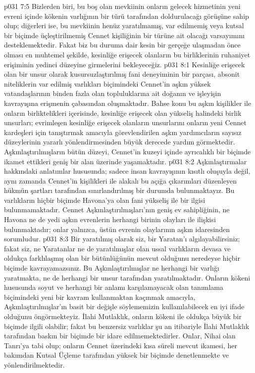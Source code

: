 \vs p031 7:5 Bizlerden biri, bu boş olan mevkiinin onların gelecek hizmetinin yeni evreni içinde kökenin varlığının bir türü tarafından doldurulacağı görüşüne sahip olup; diğerleri ise, bu mevkiinin henüz yaratılmamış, var edilmemiş veya kutsal bir biçimde üçleştirilmemiş Cennet kişiliğinin bir türüne ait olacağı varsayımını desteklemektedir. Fakat biz bu duruma dair kesin bir gerçeğe ulaşmadan önce olması en muhtemel şekilde, kesinliğe erişecek olanların bu birliklerinin ruhaniyet erişiminin yedinci düzeyine girmelerini bekleyeceğiz.
\vs p031 8:1 Kesinliğe erişecek olan bir unsur olarak kusursuzlaştırılmış fani deneyiminin bir parçası, absonit niteliklerin var edilmiş varlıkları biçimindeki Cennet’in aşkın yüksek vatandaşlarının binden fazla olan topluluklarına ait doğanın ve işleyişin kavrayışına erişmenin çabasından oluşmaktadır. Bahse konu bu aşkın kişilikler ile onların birliktelikleri içerisinde, kesinliğe erişecek olan yükseliş halindeki birlik unsurları; evrimleşen kesinliğe erişecek olanların unsurlarını onların yeni Cennet kardeşleri için tanıştırmak amacıyla görevlendirilen aşkın yardımcıların sayısız düzeylerinin yararlı yönlendirmesinden büyük derecede yardım görmektedir. Aşkınlaştırılmışların bütün düzeyi, Cennet’in kuzeyi içinde ayrıcalıklı bir biçimde ikamet ettikleri geniş bir alan üzerinde yaşamaktadır.
\vs p031 8:2 Aşkınlaştırmalar hakkındaki anlatımlar hususunda; sadece insan kavrayışının kısıtlı oluşuyla değil, aynı zamanda Cennet’in kişilikleri ile alakalı bu açığa çıkarımları düzenleyen hükmün şartları tarafından sınırlandırılmış bir durumda bulunmaktayız. Bu varlıkların hiçbir biçimde Havona’ya olan fani yükseliş ile bir ilgisi bulunmamaktadır. Cennet Aşkınlaştırılmışları’nın geniş ev sahipliğinin, ne Havona ne de yedi aşkın evrenlerin herhangi birinin olayları ile ilişkisi bulunmaktadır; onlar yalnızca, üstün evrenin olaylarının aşkın idaresinden sorumludur.
\vs p031 8:3 Bir yaratılmış olarak siz, bir Yaratan’ı algılayabilirsiniz; fakat siz, ne Yaratanlar ne de yaratılmışlar olan ussal varlıkların devasa ve oldukça farklılaşmış olan bir bütünlüğünün mevcut olduğunu neredeyse hiçbir biçimde kavrayamazsınız. Bu Aşkınlaştırılmışlar ne herhangi bir varlığı yaratmakta, ne de herhangi bir unsur tarafından yaratılmaktadır. Onların kökeni hususunda soyut ve herhangi bir anlamı karşılamayacak olan tanımlama biçimindeki yeni bir kavram kullanmaktan kaçınmak amacıyla, Aşkınlaştırılmışlar’ın basit bir değişle  söylememizin kullanılabilecek en iyi ifade olduğunu öngörmekteyiz. İlahi Mutlaklık, onların kökeni ile oldukça büyük bir biçimde ilgili olabilir; fakat bu benzersiz varlıklar şu an itibariyle İlahi Mutlaklık tarafından baskın bir biçimde bir idare edilmemektedirler. Onlar, Nihai olan Tanrı’ya tabi olup; onların Cennet üzerindeki kısa süreli mevcut ikamesi, her bakımdan Kutsal Üçleme tarafından yüksek bir biçimde denetlenmekte ve yönlendirilmektedir.
